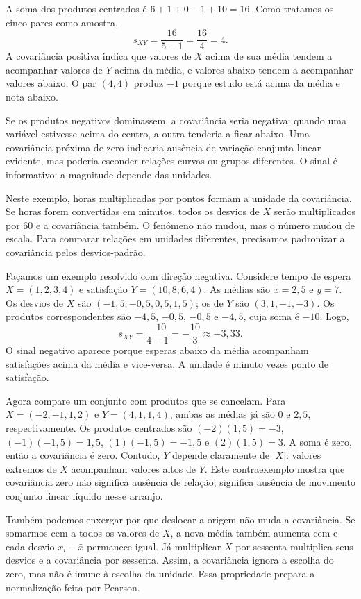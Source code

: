 A soma dos produtos centrados é $6+1+0-1+10=16$. Como tratamos os cinco pares como amostra,
\[
s_{XY}=\frac{16}{5-1}=\frac{16}{4}=4.
\]
A covariância positiva indica que valores de $X$ acima de sua média tendem a acompanhar valores de $Y$ acima da média, e valores abaixo tendem a acompanhar valores abaixo. O par $(4,4)$ produz $-1$ porque estudo está acima da média e nota abaixo.

Se os produtos negativos dominassem, a covariância seria negativa: quando uma variável estivesse acima do centro, a outra tenderia a ficar abaixo. Uma covariância próxima de zero indicaria ausência de variação conjunta linear evidente, mas poderia esconder relações curvas ou grupos diferentes. O sinal é informativo; a magnitude depende das unidades.

Neste exemplo, horas multiplicadas por pontos formam a unidade da covariância. Se horas forem convertidas em minutos, todos os desvios de $X$ serão multiplicados por $60$ e a covariância também. O fenômeno não mudou, mas o número mudou de escala. Para comparar relações em unidades diferentes, precisamos padronizar a covariância pelos desvios-padrão.

Façamos um exemplo resolvido com direção negativa. Considere tempo de espera $X=(1,2,3,4)$ e satisfação $Y=(10,8,6,4)$. As médias são $\bar{x}=2{,}5$ e $\bar{y}=7$. Os desvios de $X$ são $(-1{,}5,-0{,}5,0{,}5,1{,}5)$; os de $Y$ são $(3,1,-1,-3)$. Os produtos correspondentes são $-4{,}5$, $-0{,}5$, $-0{,}5$ e $-4{,}5$, cuja soma é $-10$. Logo,
\[
s_{XY}=\frac{-10}{4-1}=-\frac{10}{3}\approx-3{,}33.
\]
O sinal negativo aparece porque esperas abaixo da média acompanham satisfações acima da média e vice-versa. A unidade é minuto vezes ponto de satisfação.

Agora compare um conjunto com produtos que se cancelam. Para $X=(-2,-1,1,2)$ e $Y=(4,1,1,4)$, ambas as médias já são $0$ e $2{,}5$, respectivamente. Os produtos centrados são $(-2)(1{,}5)=-3$, $(-1)(-1{,}5)=1{,}5$, $(1)(-1{,}5)=-1{,}5$ e $(2)(1{,}5)=3$. A soma é zero, então a covariância é zero. Contudo, $Y$ depende claramente de $|X|$: valores extremos de $X$ acompanham valores altos de $Y$. Este contraexemplo mostra que covariância zero não significa ausência de relação; significa ausência de movimento conjunto linear líquido nesse arranjo.

Também podemos enxergar por que deslocar a origem não muda a covariância. Se somarmos cem a todos os valores de $X$, a nova média também aumenta cem e cada desvio $x_i-\bar{x}$ permanece igual. Já multiplicar $X$ por sessenta multiplica seus desvios e a covariância por sessenta. Assim, a covariância ignora a escolha do zero, mas não é imune à escolha da unidade. Essa propriedade prepara a normalização feita por Pearson.

